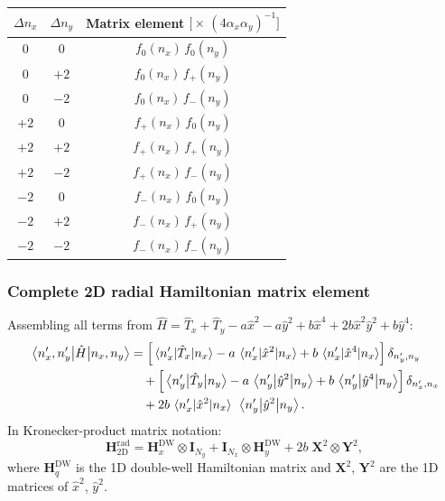 \begin{center}
\renewcommand{\arraystretch}{1.4}
\begin{tabular}{ccc}
\toprule
$\Delta n_x$ & $\Delta n_y$ &
  Matrix element $\bigl[\times\,(4\alpha_x\alpha_y)^{-1}\bigr]$ \\
\midrule
$0$    & $0$    & $f_0(n_x)\,f_0(n_y)$ \\
$0$    & $+2$   & $f_0(n_x)\,f_+(n_y)$ \\
$0$    & $-2$   & $f_0(n_x)\,f_-(n_y)$ \\
$+2$   & $0$    & $f_+(n_x)\,f_0(n_y)$ \\
$+2$   & $+2$   & $f_+(n_x)\,f_+(n_y)$ \\
$+2$   & $-2$   & $f_+(n_x)\,f_-(n_y)$ \\
$-2$   & $0$    & $f_-(n_x)\,f_0(n_y)$ \\
$-2$   & $+2$   & $f_-(n_x)\,f_+(n_y)$ \\
$-2$   & $-2$   & $f_-(n_x)\,f_-(n_y)$ \\
\bottomrule
\end{tabular}
\end{center}

\subsubsection{Complete 2D radial Hamiltonian matrix element}

Assembling all terms from
$\hat{H} = \hat{T}_x + \hat{T}_y - a\hat{x}^2 - a\hat{y}^2
+ b\hat{x}^4 + 2b\hat{x}^2\hat{y}^2 + b\hat{y}^4$:
\begin{align}\label{eq:H_2d_radial_full}
    \mel{n'_x, n'_y}{\hat{H}}{n_x, n_y}
    &= \Bigl[\mel{n'_x}{\hat{T}_x}{n_x} - a\,\mel{n'_x}{\hat{x}^2}{n_x}
    + b\,\mel{n'_x}{\hat{x}^4}{n_x}\Bigr]\,\delta_{n'_y,n_y}
    \notag\\
    &\quad+ \Bigl[\mel{n'_y}{\hat{T}_y}{n_y} - a\,\mel{n'_y}{\hat{y}^2}{n_y}
    + b\,\mel{n'_y}{\hat{y}^4}{n_y}\Bigr]\,\delta_{n'_x,n_x}
    \notag\\
    &\quad+ 2b\,\mel{n'_x}{\hat{x}^2}{n_x}\;\mel{n'_y}{\hat{y}^2}{n_y}.
\end{align}
In Kronecker-product matrix notation:
\begin{equation}\label{eq:H_2d_radial_kron}
    \mathbf{H}_\mathrm{2D}^\mathrm{rad}
    = \mathbf{H}_x^\mathrm{DW} \otimes \mathbf{I}_{N_y}
    + \mathbf{I}_{N_x} \otimes \mathbf{H}_y^\mathrm{DW}
    + 2b\;\mathbf{X}^2 \otimes \mathbf{Y}^2,
\end{equation}
where $\mathbf{H}_q^\mathrm{DW}$ is the 1D double-well Hamiltonian matrix and
$\mathbf{X}^2$, $\mathbf{Y}^2$ are the 1D matrices of $\hat{x}^2$,
$\hat{y}^2$.

